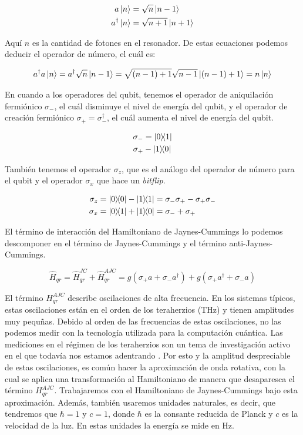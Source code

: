 \begin{align}
    a \ket{n} &= \sqrt{n} \ket{n-1} \\
    a^\dagger \ket{n} &= \sqrt{n+1} \ket{n+1}
\end{align}

Aquí $n$ es la cantidad de fotones en el resonador. De estas ecuaciones podemos deducir el operador de número, el cuál es:

\begin{equation}
    a^\dagger a \ket{n} = a^\dagger \sqrt{n} \ket{n-1} = \sqrt{(n-1)+1} \sqrt{n-1} \ket{(n-1)+1} = n \ket{n}
\end{equation}

En cuando a los operadores del qubit, tenemos el operador de aniquilación fermiónico $\sigma_-$, el cuál disminuye el nivel de energía del qubit, y el operador de creación fermiónico $\sigma_+ = \sigma_-^\dagger$, el cuál aumenta el nivel de energía del qubit.

\begin{align}
    \sigma_- &= \ketbra{0}{1} \\
    \sigma_+ &- \ketbra{1}{0}
\end{align}

También tenemos el operador $\sigma_z$, que es el análogo del operador de número para el qubit y el operador $\sigma_x$ que hace un \textit{bitflip}.

\begin{align}
    \sigma_z &= \ketbra{0} - \ketbra{1} = \sigma_-\sigma_+ - \sigma_+\sigma_- \\
    \sigma_x &= \ketbra{0}{1} + \ketbra{1}{0} = \sigma_- + \sigma_+
\end{align}

El término de interacción del Hamiltoniano de Jaynes-Cummings lo podemos descomponer en el término de Jaynes-Cummings y el término anti-Jaynes-Cummings.

\begin{equation}
    \hat{H}_{qr} = \hat{H}_{qr}^{JC} + \hat{H}_{qr}^{AJC} = g(\sigma_+ a + \sigma_- a^\dag) + g(\sigma_+ a^\dag + \sigma_- a)
\end{equation}

El término $H_{qr}^{AJC}$ describe oscilaciones de alta frecuencia. En los sistemas típicos, estas oscilaciones están en el orden de los teraherzios (THz) y tienen amplitudes muy pequñas. Debido al orden de las frecuencias de estas oscilaciones, no las podemos medir con la tecnología utilizada para la computación cuántica. Las mediciones en el régimen de los teraherzios son un tema de investigación activo en el que todavía nos estamos adentrando \cite{schmuttenmaer}. Por esto y la amplitud despreciable de estas oscilaciones, es común hacer la aproximación de onda rotativa, con la cual se aplica una transformación al Hamiltoniano de manera que desaparesca el término $H_{qr}^{AJC}$. Trabajaremos con el Hamiltoniano de Jaynes-Cummings bajo esta aproximación. Además, también usaremos unidades naturales, es decir, que tendremos que $\hbar = 1$ y $c = 1$, donde $\hbar$ es la consante reducida de Planck y $c$ es la velocidad de la luz. En estas unidades la energía se mide en Hz.

